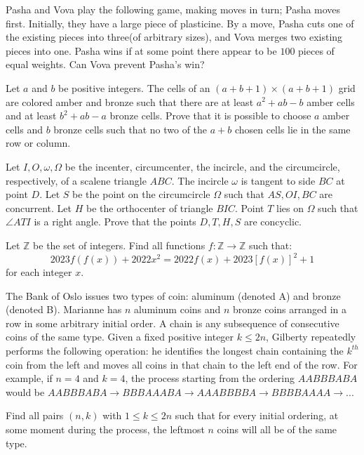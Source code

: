\documentclass[11pt]{scrartcl}
\begin{document}
\begin{problem}[829271701496996]
Pasha and Vova play the following game, making moves in turn; Pasha moves first. Initially, they have a large piece of plasticine. By a move, Pasha cuts one of the existing pieces into three(of arbitrary sizes), and Vova merges two existing pieces into one. Pasha wins if at some point there appear to be $100$ pieces of equal weights. Can Vova prevent Pasha's win?
\end{problem}
\begin{problem}[257453182523555]
Let $a$ and $b$ be positive integers. The cells of an $(a+b+1)\times (a+b+1)$ grid are colored amber and bronze such that there are at least $a^2+ab-b$ amber cells and at least $b^2+ab-a$ bronze cells. Prove that it is possible to choose $a$ amber cells and $b$ bronze cells such that no two of the $a+b$ chosen cells lie in the same row or column.
\end{problem}
\begin{problem}[1168447466971762345]
	Let $I, O, \omega, \Omega$ be the incenter, circumcenter, the incircle, and the circumcircle, respectively, of a scalene triangle $ABC$. The incircle $\omega$ is tangent to side $BC$ at point $D$. Let $S$ be the point on the circumcircle $\Omega$ such that $AS, OI, BC$ are concurrent. Let $H$ be the orthocenter of triangle $BIC$. Point $T$ lies on $\Omega$ such that $\angle ATI$ is a right angle. Prove that the points $D, T, H, S$ are concyclic.
\end{problem}
\begin{problem}[834743022162424]
Let $\mathbb{Z}$ be the set of integers. Find all functions $f:\mathbb{Z}\rightarrow\mathbb{Z}$ such that:
$$2023f(f(x))+2022x^2=2022f(x)+2023[f(x)]^2+1$$for each integer $x$.
\end{problem}
\begin{problem}[587866144613888]
The Bank of Oslo issues two types of coin: aluminum (denoted A) and bronze (denoted B). Marianne has $n$ aluminum coins and $n$ bronze coins arranged in a row in some arbitrary initial order. A chain is any subsequence of consecutive coins of the same type. Given a fixed positive integer $k \leq 2n$, Gilberty repeatedly performs the following operation: he identifies the longest chain containing the $k^{th}$ coin from the left and moves all coins in that chain to the left end of the row. For example, if $n=4$ and $k=4$, the process starting from the ordering $AABBBABA$ would be $AABBBABA \to BBBAAABA \to AAABBBBA \to BBBBAAAA \to ...$

Find all pairs $(n,k)$ with $1 \leq k \leq 2n$ such that for every initial ordering, at some moment during the process, the leftmost $n$ coins will all be of the same type.
\end{problem}
\end{document}
